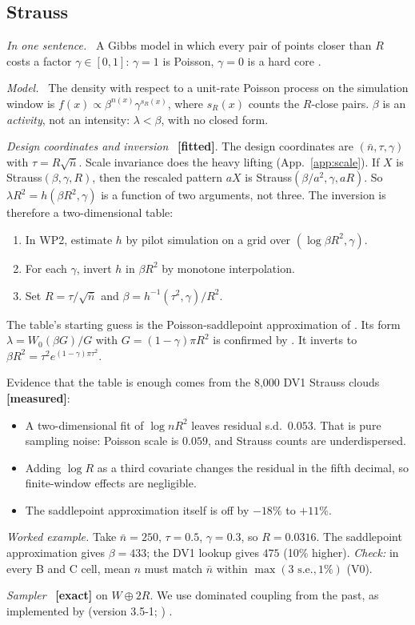 \documentclass[10pt,a4paper]{article}
\newcommand{\code}[1]{\texttt{\detokenize{#1}}}
\newcommand{\exact}{\textcolor{green!45!black}{\textbf{[exact]}}}
\newcommand{\fitted}{\textcolor{orange!85!black}{\textbf{[fitted]}}}
\newcommand{\measured}{\textcolor{green!45!black}{\textbf{[measured]}}}
\newcommand{\nbar}{\bar n}
\newcommand{\sub}[1]{\par\textit{#1}\ }
\begin{document}
\subsection{Strauss}\label{sec:strauss}
\sub{In one sentence.} A Gibbs model in which every pair of points closer than $R$ costs a factor $\gamma\in[0,1]$: $\gamma=1$ is Poisson, $\gamma=0$ is a hard core \citep{Strauss1975,KellyRipley1976}.
\sub{Model.} The density with respect to a unit-rate Poisson process on the simulation window is $f(x)\propto\beta^{n(x)}\gamma^{s_R(x)}$, where $s_R(x)$ counts the $R$-close pairs. $\beta$ is an \emph{activity}, not an intensity: $\lambda<\beta$, with no closed form.
\sub{Design coordinates and inversion} \fitted. The design coordinates are $(\nbar,\tau,\gamma)$ with $\tau=R\sqrt{\nbar}$. Scale invariance does the heavy lifting (App.~\ref{app:scale}). If $X$ is Strauss$(\beta,\gamma,R)$, then the rescaled pattern $aX$ is Strauss$(\beta/a^2,\gamma,aR)$. So $\lambda R^2=h(\beta R^2,\gamma)$ is a function of two arguments, not three. The inversion is therefore a two-dimensional table:
\begin{enumerate}
  \item In WP2, estimate $h$ by pilot simulation on a grid over $(\log\beta R^2,\gamma)$.
  \item For each $\gamma$, invert $h$ in $\beta R^2$ by monotone interpolation.
  \item Set $R=\tau/\sqrt{\nbar}$ and $\beta=h^{-1}(\tau^2,\gamma)/R^2$.
\end{enumerate}
The table's starting guess is the Poisson-saddlepoint approximation of \citet{BaddeleyNair2012}. Its form $\lambda=W_0(\beta G)/G$ with $G=(1-\gamma)\pi R^2$ is confirmed by \citet{CoeurjollyLavancier2018}. It inverts to $\beta R^2=\tau^2e^{(1-\gamma)\pi\tau^2}$.

Evidence that the table is enough comes from the 8{,}000 DV1 Strauss clouds \measured:
\begin{itemize}
  \item A two-dimensional fit of $\log n R^2$ leaves residual s.d.\ $0.053$. That is pure sampling noise: Poisson scale is $0.059$, and Strauss counts are underdispersed.
  \item Adding $\log R$ as a third covariate changes the residual in the fifth decimal, so finite-window effects are negligible.
  \item The saddlepoint approximation itself is off by $-18\%$ to $+11\%$.
\end{itemize}
\emph{Worked example.} Take $\nbar=250$, $\tau=0.5$, $\gamma=0.3$, so $R=0.0316$. The saddlepoint approximation gives $\beta=433$; the DV1 lookup gives $475$ (10\% higher). \emph{Check:} in every B and C cell, mean $n$ must match $\nbar$ within $\max(3\text{ s.e.},1\%)$ (V0).
\sub{Sampler} \exact{} on $W\oplus2R$. We use dominated coupling from the past, as implemented by \code{spatstat.random::rStrauss} (version 3.5-1; \citealp{Baddeley2015}) \citep{ProppWilson1996,KendallMoller2000,BerthelsenMoller2002,BerthelsenMoller2003}.
\end{document}
